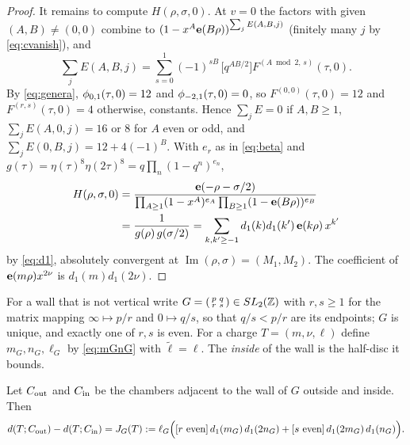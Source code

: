 \begin{proof}
It remains to compute $H(\rho,\sigma,0)$. At $v=0$ the factors with given $(A,B)\ne(0,0)$ combine to $(1-x^A\mathbf e(B\rho))^{\sum_jE(A,B,j)}$ (finitely many $j$ by \eqref{eq:cvanish}), and
\[
\sum_jE(A,B,j)=\sum_{s=0}^1(-1)^{sB}\,\big[q^{AB/2}\big]F^{(A\bmod2,\,s)}(\tau,0).
\]
By \eqref{eq:genera}, $\phi_{0,1}(\tau,0)=12$ and $\phi_{-2,1}(\tau,0)=0$, so $F^{(0,0)}(\tau,0)=12$ and $F^{(r,s)}(\tau,0)=4$ otherwise, constants. Hence $\sum_jE=0$ if $A,B\ge1$, $\sum_jE(A,0,j)=16$ or $8$ for $A$ even or odd, and $\sum_jE(0,B,j)=12+4(-1)^B$. With $e_r$ as in \eqref{eq:beta} and $g(\tau)=\eta(\tau)^8\eta(2\tau)^8=q\prod_n(1-q^n)^{e_n}$,
\begin{align*}
H(\rho,\sigma,0)&=\frac{\mathbf e(-\rho-\sigma/2)}{\prod_{A\ge1}(1-x^A)^{e_A}\prod_{B\ge1}(1-\mathbf e(B\rho))^{e_B}}\\
&=\frac1{g(\rho)\,g(\sigma/2)}=\sum_{k,k'\ge-1}d_1(k)d_1(k')\,\mathbf e(k\rho)\,x^{k'}
\end{align*}
by \eqref{eq:d1}, absolutely convergent at $\operatorname{Im}(\rho,\sigma)=(M_1,M_2)$. The coefficient of $\mathbf e(m\rho)x^{2\nu}$ is $d_1(m)d_1(2\nu)$.
\end{proof}

For a wall that is not vertical write $G=\begin{psmallmatrix}p&q\\r&s\end{psmallmatrix}\in SL_2(\mathbb{Z})$ with $r,s\ge1$ for the matrix mapping $\infty\mapsto p/r$ and $0\mapsto q/s$, so that $q/s<p/r$ are its endpoints; $G$ is unique, and exactly one of $r,s$ is even. For a charge $T=(m,\nu,\ell)$ define $m_G,n_G,\ell_G$ by \eqref{eq:mGnG} with $\tilde\ell=\ell$. The \emph{inside} of the wall is the half-disc it bounds.

\begin{corollary}[Transport]\label{cor:transport}
Let $C_{\rm out}$ and $C_{\rm in}$ be the chambers adjacent to the wall of $G$ outside and inside. Then
\[
d(T;C_{\rm out})-d(T;C_{\rm in})=J_G(T):=\ell_G\Big([r\ \text{even}]\,d_1(m_G)\,d_1(2n_G)+[s\ \text{even}]\,d_1(2m_G)\,d_1(n_G)\Big).
\]
\end{corollary}

